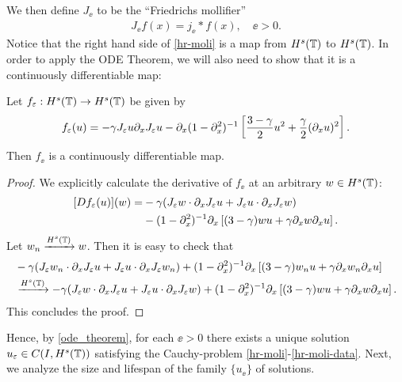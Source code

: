 We then define $J_\ee$ to be the ``Friedrichs mollifier''
\begin{equation}
\begin{split}
J_\ee f(x) = j_\ee * f(x), \quad \ee>0.
\end{split}
\end{equation}
%
%
Notice that the right hand side of \eqref{hr-moli} is a map from $H^s(\mathbb{T})$
to $H^s(\mathbb{T})$.  In order to apply the ODE Theorem, we will also need to
show that it is a continuously differentiable map:
%
%
%
\begin{lemma}
Let $f_\varepsilon:H^s(\mathbb{T}) \to H^s(\mathbb{T})$ be given by 
\begin{equation}
\label{f_ep}
f_{\varepsilon}(u) = -\gamma  J_\varepsilon u \partial_x J_\varepsilon u
- \partial_x (1-\partial_x^2)^{-1} \left
[\frac{3-\gamma}{2}u^2 + \frac{\gamma}{2}(\partial_x u)^2 \right ].
\end{equation}
Then $f_\ee$  is a continuously differentiable map.
\end{lemma}
%
%
\begin{proof} We explicitly calculate the derivative of $f_\ee$ at an
arbitrary $w \in H^s(\mathbb{T})$:
\begin{equation*}
\begin{split}
[Df_{\varepsilon}(u)](w)
=
& -\gamma (J_\varepsilon w \cdot \partial_x J_\varepsilon u +
J_\varepsilon u \cdot \partial_x J_\varepsilon w)
\\
& - (1-\partial_x ^2)^{-1}
\partial_x \left [(3-\gamma)w u + \gamma\partial_x w \partial_x u \right ].
\end{split}
\end{equation*}
Let $w_n \xrightarrow{H^s(\mathbb{T})} w$. Then it is easy to check that
%
\begin{equation}
\begin{split}
& -\gamma (J_\varepsilon w_n \cdot \partial_x J_\varepsilon u 
+ J_\varepsilon u \cdot \partial_x J_\varepsilon w_n)
+ (1-\partial_x ^2)^{-1}
\partial_x \left [(3-\gamma)w_n u + \gamma\partial_x w_n \partial_x u \right ]
\\
& \xrightarrow{H^s(\mathbb{T})} 
-\gamma (J_\varepsilon w \cdot \partial_x J_\varepsilon u 
+ J_\varepsilon u \cdot \partial_x J_\varepsilon w) + (1-\partial_x ^2)^{-1}
\partial_x \left [(3-\gamma)w u + \gamma\partial_x w \partial_x u \right ].
\end{split}
\end{equation}
This concludes the proof. 
\end{proof}
Hence, by \cref{ode_theorem}, for each $\ee > 0$ there exists a
unique solution $u_\varepsilon \in C(I, H^s(\mathbb{T}))$ satisfying the Cauchy-problem
\eqref{hr-moli}-\eqref{hr-moli-data}. Next, we analyze the size and
lifespan of the family $\{u_\ee\}$ of solutions.
%
%
%
%
